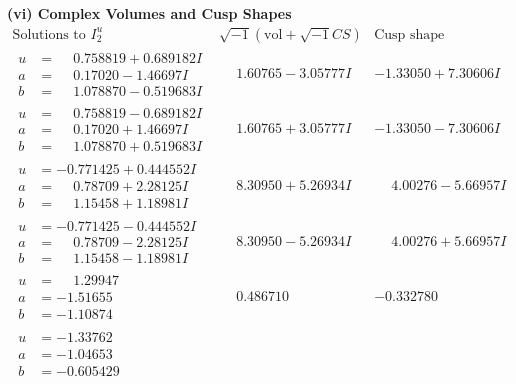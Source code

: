 \documentclass[1p]{elsarticle_modified}
\theoremstyle{definition}
\newcommand{\I}{\sqrt{-1}}
\begin{document}
\newpage\flushleft \textbf{(vi) Complex Volumes and Cusp Shapes}
$$\begin{array}{c|c|c}  
\text{Solutions to }I^u_{2}& \I (\text{vol} + \sqrt{-1}CS) & \text{Cusp shape}\\
 \hline 
\begin{aligned}
u &= \phantom{-}0.758819 + 0.689182 I \\
a &= \phantom{-}0.17020 - 1.46697 I \\
b &= \phantom{-}1.078870 - 0.519683 I\end{aligned}
 & \phantom{-}1.60765 - 3.05777 I & -1.33050 + 7.30606 I \\ \hline\begin{aligned}
u &= \phantom{-}0.758819 - 0.689182 I \\
a &= \phantom{-}0.17020 + 1.46697 I \\
b &= \phantom{-}1.078870 + 0.519683 I\end{aligned}
 & \phantom{-}1.60765 + 3.05777 I & -1.33050 - 7.30606 I \\ \hline\begin{aligned}
u &= -0.771425 + 0.444552 I \\
a &= \phantom{-}0.78709 + 2.28125 I \\
b &= \phantom{-}1.15458 + 1.18981 I\end{aligned}
 & \phantom{-}8.30950 + 5.26934 I & \phantom{-}4.00276 - 5.66957 I \\ \hline\begin{aligned}
u &= -0.771425 - 0.444552 I \\
a &= \phantom{-}0.78709 - 2.28125 I \\
b &= \phantom{-}1.15458 - 1.18981 I\end{aligned}
 & \phantom{-}8.30950 - 5.26934 I & \phantom{-}4.00276 + 5.66957 I \\ \hline\begin{aligned}
u &= \phantom{-}1.29947\phantom{ +0.000000I} \\
a &= -1.51655\phantom{ +0.000000I} \\
b &= -1.10874\phantom{ +0.000000I}\end{aligned}
 & \phantom{-}0.486710\phantom{ +0.000000I} & -0.332780\phantom{ +0.000000I} \\ \hline\begin{aligned}
u &= -1.33762\phantom{ +0.000000I} \\
a &= -1.04653\phantom{ +0.000000I} \\
b &= -0.605429\phantom{ +0.000000I}\end{aligned}

\end{array}$$
\end{document}
